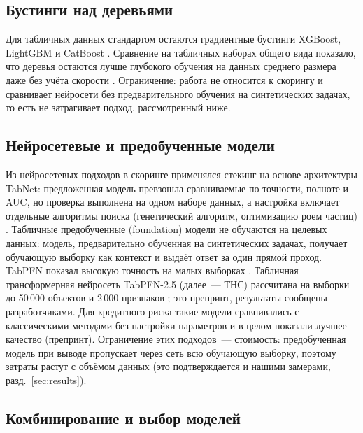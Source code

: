 \documentclass{misisarticle}
\begin{document}
\subsection{Бустинги над деревьями}

Для табличных данных стандартом остаются градиентные бустинги XGBoost, LightGBM и CatBoost \cite{xgboost,lightgbm,catboost}. Сравнение на табличных наборах общего вида показало, что деревья остаются лучше глубокого обучения на данных среднего размера даже без учёта скорости \cite{grinsztajn2022}. Ограничение: работа не относится к скорингу и сравнивает нейросети без предварительного обучения на синтетических задачах, то есть не затрагивает подход, рассмотренный ниже.

\subsection{Нейросетевые и предобученные модели}

Из нейросетевых подходов в скоринге применялся стекинг на основе архитектуры TabNet: предложенная модель превзошла сравниваемые по точности, полноте и AUC, но проверка выполнена на одном наборе данных, а настройка включает отдельные алгоритмы поиска (генетический алгоритм, оптимизацию роем частиц) \cite{wang2024}. Табличные предобученные (foundation) модели не обучаются на целевых данных: модель, предварительно обученная на синтетических задачах, получает обучающую выборку как контекст и выдаёт ответ за один прямой проход. TabPFN показал высокую точность на малых выборках \cite{hollmann2025}. Табличная трансформерная нейросеть TabPFN-2.5 (далее~--- ТНС) рассчитана на выборки до 50\,000 объектов и 2\,000 признаков \cite{tabpfn25}; это препринт, результаты сообщены разработчиками. Для кредитного риска такие модели сравнивались с классическими методами без настройки параметров и в целом показали лучшее качество \cite{baesens2026} (препринт). Ограничение этих подходов~--- стоимость: предобученная модель при выводе пропускает через сеть всю обучающую выборку, поэтому затраты растут с объёмом данных (это подтверждается и нашими замерами, разд.~\ref{sec:results}).

\subsection{Комбинирование и выбор моделей}
\end{document}
